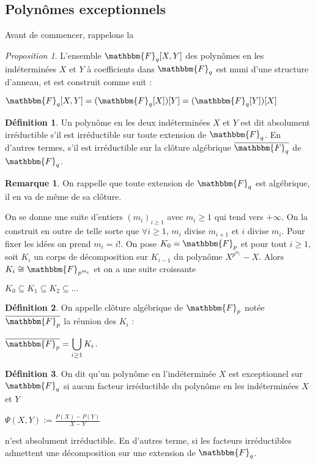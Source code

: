 \documentclass[12pt]{article}
\theoremstyle{remark}\newtheorem{note}{Note}
\theoremstyle{remark}\newtheorem{nota}{Notation}
\newcommand{\Fq}{\mathbbm{F}_q}
\newtheorem{prop}{Proposition}
\theoremstyle{definition}
\newtheorem{definition}{Définition}
\newtheorem{rem}{Remarque}
\begin{document}
\subsection{Polynômes exceptionnels}
Avant de commencer, rappelons la 

\begin{prop}
L'ensemble $\Fq[X,Y]$ des polynômes en les indéterminées $X$ et $Y$ à coefficients dans $\Fq$ est muni d'une structure d'anneau, et est construit comme suit :
\begin{center} $\Fq[X,Y] = (\Fq[X])[Y] = (\Fq[Y])[X]$ \end{center}
\end{prop}

\begin{definition}
Un polynôme en les deux indéterminées $X$ et $Y$ est dit absolument irréductible s'il est irréductible sur toute extension de $\Fq$. En d'autres termes, s'il est irréductible sur la clôture algébrique $\overline{\Fq}$ de $\Fq$. 

\begin{rem}
On rappelle que toute extension de $\Fq$ est algébrique, il en va de même de sa clôture.
\end{rem}

\end{definition}
On se donne une suite d'entiers $(m_i)_{i \geq 1}$ avec $m_i \geq 1$ qui tend vers $+ \infty$. On la construit en outre de telle sorte que $\forall i \geq 1$, $m_i$ divise $m_{i+1}$ et $i$ divise $m_i$. Pour fixer les idées on prend $m_i = i !$. On pose $K_0 = \mathbbm{F}_p$ et pour tout $i \geq 1$, soit $K_i$ un corps de décomposition sur $K_{i-1}$ du polynôme $X^{p^{m_i}} - X$. Alors $K_i \cong \mathbbm{F}_{p^{m_i}}$ et on a une suite croissante
\begin{center}
$K_0 \subseteq K_1 \subseteq K_2 \subseteq ...$
\end{center}
\begin{definition}
On appelle clôture algébrique de $\mathbbm{F}_p$ notée $\overline{\mathbbm{F}_p}$ la réunion des $K_i$ :
\begin{center}
$\overline{\mathbbm{F}_p} = \displaystyle \bigcup_{i \geq 1} K_i$.
\end{center}
\end{definition}

\begin{definition}
On dit qu'un polynôme en l'indéterminée $X$ est exceptionnel sur $\Fq$ si aucun facteur irréductible du polynôme en les indéterminées $X$ et $Y$
\begin{center}
$\Psi (X,Y) := \displaystyle\frac{P(X) - P(Y)}{X-Y}$
\end{center}
n'est absolument irréductible. En d'autres terme, si les facteurs irréductibles admettent une décomposition sur une extension de $\Fq$.
\end{definition}
\end{document}
